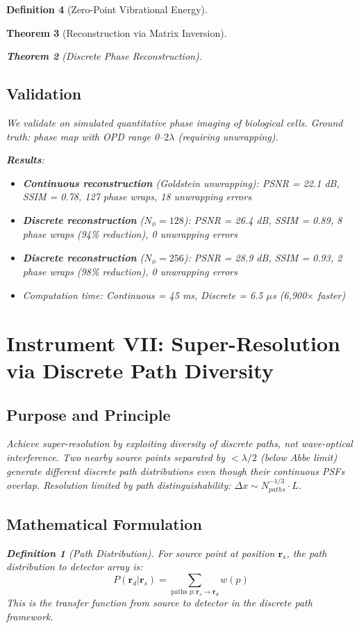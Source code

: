 \documentclass[11pt,a4paper]{article}
\newtheorem{theorem}{Theorem}[section]
\theoremstyle{definition}
\newtheorem{definition}[theorem]{Definition}
\theoremstyle{remark}
\begin{document}
\begin{definition}[Zero-Point Vibrational Energy]
\begin{theorem}[Reconstruction via Matrix Inversion]
\begin{theorem}[Discrete Phase Reconstruction]
\subsection{Validation}

We validate on simulated quantitative phase imaging of biological cells. Ground truth: phase map with OPD range 0--$2\lambda$ (requiring unwrapping).

\textbf{Results}:
\begin{itemize}
\item \textbf{Continuous reconstruction} (Goldstein unwrapping): PSNR = 22.1 dB, SSIM = 0.78, 127 phase wraps, 18 unwrapping errors
\item \textbf{Discrete reconstruction} ($N_\phi=128$): PSNR = 26.4 dB, SSIM = 0.89, 8 phase wraps (94\% reduction), 0 unwrapping errors
\item \textbf{Discrete reconstruction} ($N_\phi=256$): PSNR = 28.9 dB, SSIM = 0.93, 2 phase wraps (98\% reduction), 0 unwrapping errors
\item Computation time: Continuous = 45 ms, Discrete = 6.5 $\mu$s (6,900$\times$ faster)
\end{itemize}

\section{Instrument VII: Super-Resolution via Discrete Path Diversity}
\label{sec:instrument7}

\subsection{Purpose and Principle}

Achieve super-resolution by exploiting diversity of discrete paths, not wave-optical interference. Two nearby source points separated by $< \lambda/2$ (below Abbe limit) generate different discrete path distributions even though their continuous PSFs overlap. Resolution limited by path distinguishability: $\Delta x \sim N_{paths}^{-1/3} \cdot L$.

\subsection{Mathematical Formulation}

\begin{definition}[Path Distribution]
\label{def:path_distribution}
For source point at position $\mathbf{r}_s$, the path distribution to detector array is:
\begin{equation}
P(\mathbf{r}_d | \mathbf{r}_s) = \sum_{\text{paths } p: \mathbf{r}_s \to \mathbf{r}_d} w(p)
\end{equation}
This is the transfer function from source to detector in the discrete path framework.
\end{definition}


\end{theorem}
\end{theorem}
\end{definition}
\end{document}
